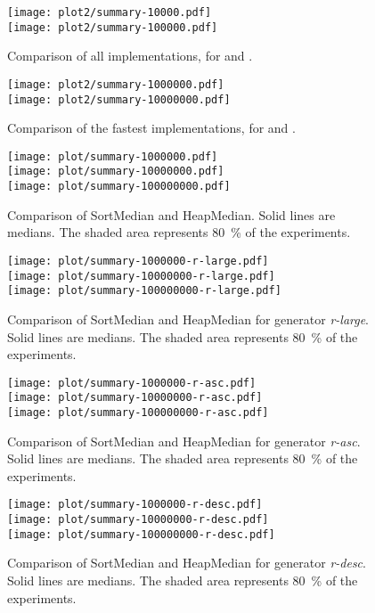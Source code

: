 \documentclass[a4paper,11pt]{article}
\begin{document}
\begin{figure}
    \centering
    \texttt{[image: plot2/summary-10000.pdf]}\\
    \texttt{[image: plot2/summary-100000.pdf]}
    \caption{Comparison of all implementations, for  and .}\label{fig:othera}
\end{figure}

\begin{figure}
    \centering
    \texttt{[image: plot2/summary-1000000.pdf]}\\
    \texttt{[image: plot2/summary-10000000.pdf]}
    \caption{Comparison of the fastest implementations, for  and .}\label{fig:otherb}
\end{figure}

\newcommand{\figexpl}{Solid lines are medians. The shaded area represents 80~\% of the experiments.}

\begin{figure}
    \centering
    \texttt{[image: plot/summary-1000000.pdf]}\\
    \texttt{[image: plot/summary-10000000.pdf]}\\
    \texttt{[image: plot/summary-100000000.pdf]}
    \caption{Comparison of SortMedian and HeapMedian. \figexpl}\label{fig:summary}
\end{figure}

\begin{figure}
    \centering
    \texttt{[image: plot/summary-1000000-r-large.pdf]}\\
    \texttt{[image: plot/summary-10000000-r-large.pdf]}\\
    \texttt{[image: plot/summary-100000000-r-large.pdf]}
    \caption{Comparison of SortMedian and HeapMedian for generator \emph{r-large}. \figexpl}\label{fig:summary-r-large}
\end{figure}

\begin{figure}
    \centering
    \texttt{[image: plot/summary-1000000-r-asc.pdf]}\\
    \texttt{[image: plot/summary-10000000-r-asc.pdf]}\\
    \texttt{[image: plot/summary-100000000-r-asc.pdf]}
    \caption{Comparison of SortMedian and HeapMedian for generator \emph{r-asc}. \figexpl}\label{fig:summary-r-asc}
\end{figure}

\begin{figure}
    \centering
    \texttt{[image: plot/summary-1000000-r-desc.pdf]}\\
    \texttt{[image: plot/summary-10000000-r-desc.pdf]}\\
    \texttt{[image: plot/summary-100000000-r-desc.pdf]}
    \caption{Comparison of SortMedian and HeapMedian for generator \emph{r-desc}. \figexpl}\label{fig:summary-r-desc}
\end{figure}
\end{document}
